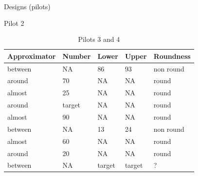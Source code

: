 \documentclass[xcolor=table, hyperref={pdfpagelabels=false}]{beamer}
\begin{document}
\begin{frame}{Designs (pilots)}
\begin{minipage}{.47\textwidth}
\begin{table}[H]
	\caption{Pilot 2}
\end{table}
\end{minipage}
\begin{minipage}{.47\textwidth}
			\begin{table}[H]
		\centering
		\begin{tabular}{l|llll}
			Approximator                        & Number & Lower & Upper  & Roundness\\ \hline
			between                             & NA     & 86          & 93          & non round \\
			around                              & 70     & NA          & NA           & round \\
			almost                              & 25     & NA          & NA           & round \\
			\rowcolor[rgb]{0.8,0.8,0.8} around  & target & NA          & NA           & round \\
			almost                              & 90     & NA          & NA           & round \\
			between                             & NA     & 13           & 24           & non round\\
			almost                              & 60     & NA          & NA          & round\\
			around                              & 20     & NA          & NA           & round \\
			\rowcolor[rgb]{0.8,0.8,0.8} between & NA     & target      & target  & ?    
		\end{tabular}
		\caption{Pilots 3 and 4}
	\end{table}
\end{minipage}
\end{frame}
\end{document}
